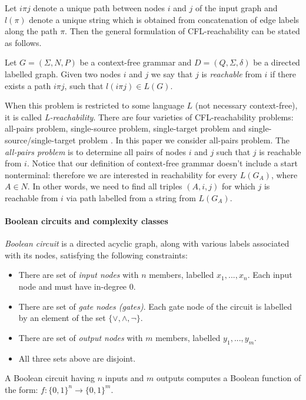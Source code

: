 Let $i\pi j$ denote a unique path between nodes $i$ and $j$ of the input graph and $l(\pi)$ denote a unique string which is obtained from concatenation of edge labels along the path $\pi$. Then the general formulation of CFL-reachability can be stated as follows.
\begin{definition}
Let $G = (\Sigma, N, P)$ be a context-free grammar and $D = (Q, \Sigma, \delta)$ be a directed labelled graph. Given two nodes $i$ and $j$ we say that $j$ is \textit{reachable} from $i$ if there exists a path $i \pi j$, such that $l(i \pi j) \in L(G)$. 
\end{definition}
When this problem is restricted to some language $L$ (not necessary context-free), it is called \textit{L-reachability}. There are four varieties of CFL-reachability problems: all-pairs problem, single-source problem, single-target problem and single-source/single-target problem \cite{RepsBasic}. In this paper we consider all-pairs problem. The \textit{all-pairs problem} is to determine all pairs of nodes $i$ and $j$ such that $j$ is reachable from $i$. Notice that our definition of context-free grammar doesn't include a start nonterminal: therefore we are interested in reachability for every $L(G_A)$, where $A \in N$. In other words, we need to find all triples $(A, i, j)$ for which $j$ is reachable from $i$ via path labelled from a string from $L(G_A)$.

\paragraph{Boolean circuits and complexity classes} 
\textit{Boolean circuit} is a directed acyclic graph, along with various labels associated with its nodes, satisfying the following constraints:
\begin{itemize}
\item There are set of \textit{input nodes} with $n$ members, labelled $x_1, . . . ,x_n$. Each input node and must have in-degree 0.
\item There are set of  \textit{gate nodes (gates)}. Each gate node of the circuit is labelled by an element of the set $\{\lor, \land, \neg \}$. 
\item There are set of \textit{output nodes} with $m$ members, labelled $y_1, . . . ,y_m$.
\item All three sets above are disjoint.
\end{itemize}
A Boolean circuit having $n$ inputs and $m$ outputs computes a Boolean function of the form: $f:{\{0, 1\}}^n \rightarrow {\{0, 1\}}^m$.


